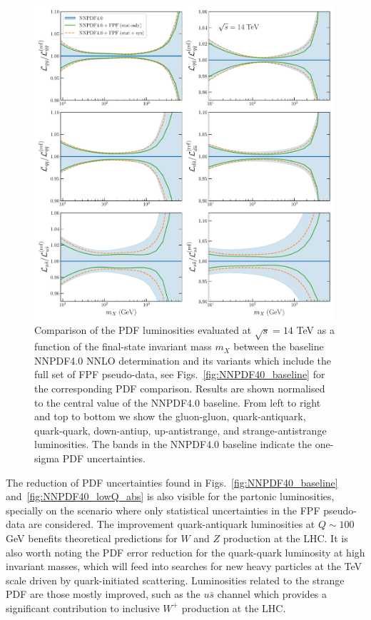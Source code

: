 \begin{figure}[htbp]
\centering
\includegraphics[width=0.99\textwidth]{plots/lumi-FPFall.pdf}
\caption{Comparison of the PDF luminosities evaluated at $\sqrt{s}=14$ TeV
  as a function of the final-state invariant mass $m_X$ between
  the baseline NNPDF4.0 NNLO determination and its variants which include
  the full set of FPF pseudo-data, see Figs.~\ref{fig:NNPDF40_baseline}
  for the corresponding PDF comparison.
  Results are shown normalised to the central value of the NNPDF4.0 baseline.
  From left to right and top to bottom we show the gluon-gluon, quark-antiquark,
  quark-quark, down-antiup, up-antistrange, and strange-antistrange luminosities.
  The bands in the NNPDF4.0 baseline indicate the one-sigma PDF uncertainties.
%
}
\label{fig:nnpdf40_fpf_lumis}
\end{figure}

The reduction of PDF uncertainties found in  Figs.~\ref{fig:NNPDF40_baseline}
and~\ref{fig:NNPDF40_lowQ_abs} is also visible
for the partonic luminosities, specially on the scenario where only statistical
uncertainties in the FPF pseudo-data are considered.
%
The improvement quark-antiquark luminosities at $Q\sim 100$ GeV
benefits theoretical predictions for $W$ and $Z$ production at the LHC.
%
It is also worth noting the PDF error reduction for the quark-quark luminosity at
high invariant masses,
which will feed into searches for new heavy particles at the TeV scale
driven by quark-initiated scattering.
%
Luminosities related to the strange PDF are those mostly
improved, such as the $u\bar{s}$ channel which provides a significant
contribution to inclusive $W^+$ production at the LHC.

